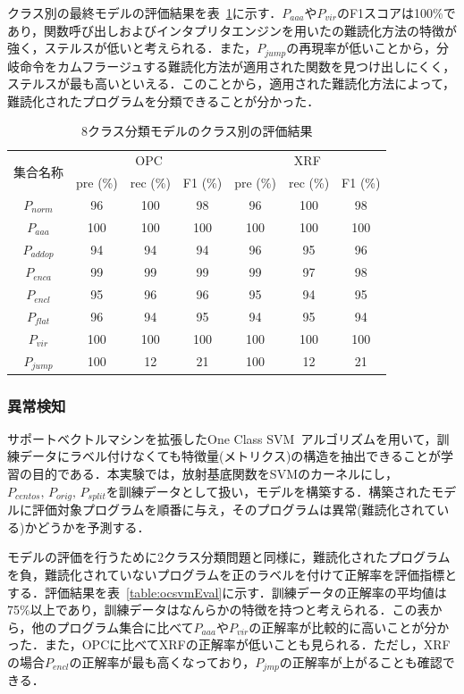 \documentclass[12pt]{jarticle}
\newcommand\doubleRule{\toprule\toprule}
\begin{document}
クラス別の最終モデルの評価結果を表~\ref{table:classRes}に示す．$P_{aaa}$や$P_{vir}$のF1スコアは100\%であり，関数呼び出しおよびインタプリタエンジンを用いたの難読化方法の特徴が強く，ステルスが低いと考えられる．また，$P_{jump}$の再現率が低いことから，分岐命令をカムフラージュする難読化方法が適用された関数を見つけ出しにくく，ステルスが最も高いといえる．このことから，適用された難読化方法によって，難読化されたプログラムを分類できることが分かった．
\begin{table}[t!]
\centering
\caption{8クラス分類モデルのクラス別の評価結果}
\label{table:classRes}
\begin{tabular}[t]{c|ccc|ccc}
\doubleRule
\multirow{2}{*}{集合名称} & \multicolumn{3}{c|}{OPC} & \multicolumn{3}{c}{XRF} \\\cline{2-7}
& pre (\%) & rec (\%) & F1 (\%) & pre (\%) & rec (\%) & F1 (\%) \\
\hline
$P_{norm}$ & 96 & 100 & 98 & 96 & 100 & 98 \\
$P_{aaa}$ & 100 & 100 & 100 & 100 & 100 & 100 \\
$P_{addop}$ & 94 & 94  & 94 & 96 & 95 & 96 \\
$P_{enca}$ & 99 & 99 & 99 & 99 & 97 & 98 \\
$P_{encl}$ & 95 & 96 & 96 & 95 & 94 & 95 \\
$P_{flat}$ & 96 & 94 & 95 & 94 & 95 & 94 \\
$P_{vir}$ & 100 & 100 & 100 & 100 & 100 & 100 \\
$P_{jump}$ & 100 & 12 & 21 & 100 & 12 & 21 \\
\bottomrule
\end{tabular}
\end{table}

\newpage

\subsubsection{異常検知}
サポートベクトルマシンを拡張したOne Class SVM~\cite{OCSVM}アルゴリズムを用いて，訓練データにラベル付けなくても特徴量(メトリクス)の構造を抽出できることが学習の目的である．本実験では，放射基底関数をSVMのカーネルにし，$P_{centos},\,P_{orig},\,P_{split}$を訓練データとして扱い，モデルを構築する．構築されたモデルに評価対象プログラムを順番に与え，そのプログラムは異常(難読化されている)かどうかを予測する．

モデルの評価を行うために2クラス分類問題と同様に，難読化されたプログラムを負，難読化されていないプログラムを正のラベルを付けて正解率を評価指標とする．評価結果を表~\ref{table:ocsvmEval}に示す．訓練データの正解率の平均値は75\%以上であり，訓練データはなんらかの特徴を持つと考えられる．この表から，他のプログラム集合に比べて$P_{aaa}$や$P_{vir}$の正解率が比較的に高いことが分かった．また，OPCに比べてXRFの正解率が低いことも見られる．ただし，XRFの場合$P_{encl}$の正解率が最も高くなっており，$P_{jmp}$の正解率が上がることも確認できる．
\end{document}
